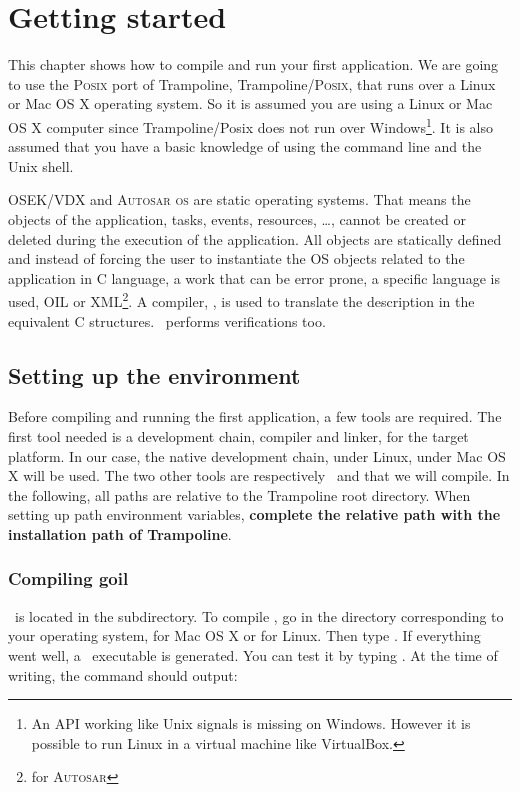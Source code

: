 
\chapter{Getting started}

This chapter shows how to compile and run your first application. We are going to use the \textsc{Posix} port of Trampoline, Trampoline/\textsc{Posix}, that runs over a Linux or Mac OS X operating system. So it is assumed you are using a Linux or Mac OS X computer since Trampoline/Posix does not run over Windows\footnote{An API working like Unix signals is missing on Windows. However it is possible to run Linux in a virtual machine like VirtualBox.}. It is also assumed that you have a basic knowledge of using the command line and the Unix shell.

OSEK/VDX and \textsc{Autosar os} are static operating systems. That means the objects of the application, tasks, events, resources, \ldots, cannot be created or deleted during the execution of the application. All objects are statically defined and instead of forcing the user to instantiate the OS objects related to the application in C language, a work that can be error prone, a specific language is used, OIL or XML\footnote{for \textsc{Autosar}}. A compiler, \goil, is used to translate the description in the equivalent C structures. \goil\ performs verifications too.

\section{Setting up the environment}

Before compiling and running the first application, a few tools are required. The first tool needed is a development chain, compiler and linker, for the target platform. In our case, the native development chain,  under Linux,  under Mac OS X will be used. The two other tools are respectively \goil\ and  that we will compile. In the following, all paths are relative to the Trampoline root directory. When setting up path environment variables, \textbf{complete the relative path with the installation path of Trampoline}.

\subsection{Compiling goil}

\goil\ is located in the  subdirectory. To compile \goil, go in the directory corresponding to your operating system,  for Mac OS X or  for Linux. Then type . If everything went well, a \goil\ executable is generated. You can test it by typing . At the time of writing, the command should output:

